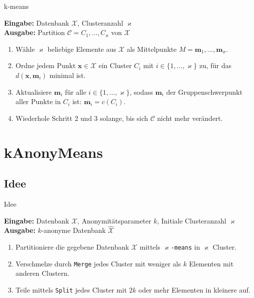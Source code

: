 \documentclass[10pt,table]{beamer}
\newcommand{\km}{\varkappa}
\newcommand{\kmeans}{$\varkappa$\texttt{-means}\xspace}
\newcommand{\kanonymeans}{\texttt{kAnonyMeans}\xspace}
\begin{document}
\begin{frame}{k-means}
    \begin{algorithm}[H]
    \renewcommand{\thealgorithm}{}
    \caption{\kmeans}
    \label{alg:kmeans}
    {\vspace*{0.1cm}
    \textbf{Eingabe:} Datenbank $\mathcal{X}$, Clusteranzahl $\km$ \\
    \textbf{Ausgabe:} Partition $\mathcal{C} = C_1,...,C_\km$ von $\mathcal{X}$
    \begin{enumerate}
    \item Wähle $\km$ beliebige Elemente aus $\mathcal{X}$ als Mittelpunkte $M = \mathbf{m}_1, ...,\mathbf{m}_\km$.
    \item Ordne jedem Punkt $\mathbf{x}\in\mathcal{X}$ ein Cluster $C_i$ mit $i \in \{1,...,\km\}$ zu, für das $d(\mathbf{x},\mathbf{m}_i)$ minimal ist.
    \item Aktualisiere $\mathbf{m}_i$ für alle $i \in \{1,...,\km\}$, sodass $\mathbf{m}_i$ der Gruppenschwerpunkt aller Punkte in $C_i$ ist: $\mathbf{m}_i = c(C_i)$.
    \item Wiederhole Schritt 2 und 3 solange, bis sich $\mathcal{C}$ nicht mehr verändert.
    \end{enumerate}
    }
    \end{algorithm}
\end{frame}

\section{kAnonyMeans}
\subsection{Idee}
\begin{frame}{Idee}
    \begin{algorithm}[H]
    \renewcommand{\thealgorithm}{}
    \caption{\kanonymeans}
    \label{alg:kanonymeans}
    {
    \textbf{Eingabe:} Datenbank $\mathcal{X}$, Anonymitätsparameter $k$, Initiale Clusteranzahl $\km$\\
    \textbf{Ausgabe:} $k$-anonyme Datenbank $\hat{\mathcal{X}}$
    \begin{enumerate}
        \item Partitioniere die gegebene Datenbank $\mathcal{X}$ mittels \kmeans in $\km$ Cluster.
        \item Verschmelze durch \texttt{Merge} jedes Cluster mit weniger als $k$ Elementen mit anderen Clustern.
        \item Teile mittels \texttt{Split} jedes Cluster mit $2k$ oder mehr Elementen in kleinere auf.
    \end{enumerate}
    }
    \end{algorithm}
\end{frame}
\end{document}
